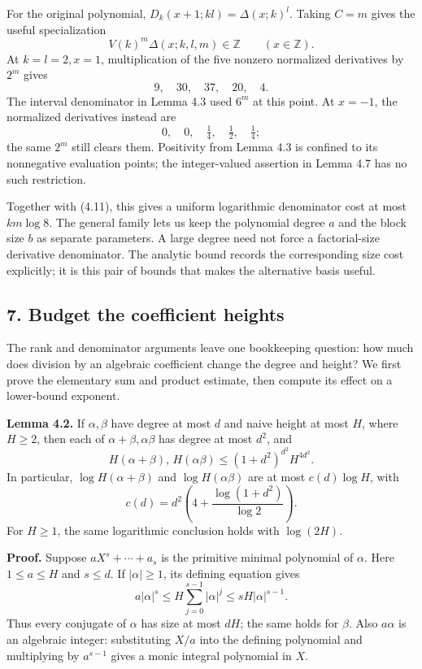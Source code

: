 \documentclass[
  11pt,
  a4paper,
]{article}
\begin{document}
For the original polynomial, \(D_k(x+1;kl)=\Delta(x;k)^l\). Taking
\(C=m\) gives the useful specialization \[
V(k)^m\Delta(x;k,l,m)\in\mathbb Z\qquad(x\in\mathbb Z).
\] At \(k=l=2,x=1\), multiplication of the five nonzero normalized
derivatives by \(2^m\) gives \[
9,\quad30,\quad37,\quad20,\quad4.
\] The interval denominator in Lemma 4.3 used \(6^m\) at this point. At
\(x=-1\), the normalized derivatives instead are \[
0,\quad0,\quad\tfrac14,\quad\tfrac12,\quad\tfrac14;
\] the same \(2^m\) still clears them. Positivity from Lemma 4.3 is
confined to its nonnegative evaluation points; the integer-valued
assertion in Lemma 4.7 has no such restriction.

Together with (4.11), this gives a uniform logarithmic denominator cost
at most \(km\log8\). The general family lets us keep the polynomial
degree \(a\) and the block size \(b\) as separate parameters. A large
degree need not force a factorial-size derivative denominator. The
analytic bound records the corresponding size cost explicitly; it is
this pair of bounds that makes the alternative basis useful.

\subsection{7. Budget the coefficient
heights}\label{budget-the-coefficient-heights}

The rank and denominator arguments leave one bookkeeping question: how
much does division by an algebraic coefficient change the degree and
height? We first prove the elementary sum and product estimate, then
compute its effect on a lower-bound exponent.

\textbf{Lemma 4.2.} If \(\alpha,\beta\) have degree at most \(d\) and
naive height at most \(H\), where \(H\ge2\), then each of
\(\alpha+\beta,\alpha\beta\) has degree at most \(d^2\), and \[
H(\alpha+\beta),\,H(\alpha\beta)
\le (1+d^2)^{d^2}H^{4d^2}. \tag{4.6}
\] In particular, \(\log H(\alpha+\beta)\) and \(\log H(\alpha\beta)\)
are at most \(c(d)\log H\), with \[
c(d)=d^2\left(4+\frac{\log(1+d^2)}{\log2}\right).
\] For \(H\ge1\), the same logarithmic conclusion holds with
\(\log(2H)\).

\textbf{Proof.} Suppose \(aX^s+\cdots+a_s\) is the primitive minimal
polynomial of \(\alpha\). Here \(1\le a\le H\) and \(s\le d\). If
\(|\alpha|\ge1\), its defining equation gives \[
a|\alpha|^s\le H\sum_{j=0}^{s-1}|\alpha|^j\le sH|\alpha|^{s-1}.
\] Thus every conjugate of \(\alpha\) has size at most \(dH\); the same
holds for \(\beta\). Also \(a\alpha\) is an algebraic integer:
substituting \(X/a\) into the defining polynomial and multiplying by
\(a^{s-1}\) gives a monic integral polynomial in \(X\).
\end{document}
